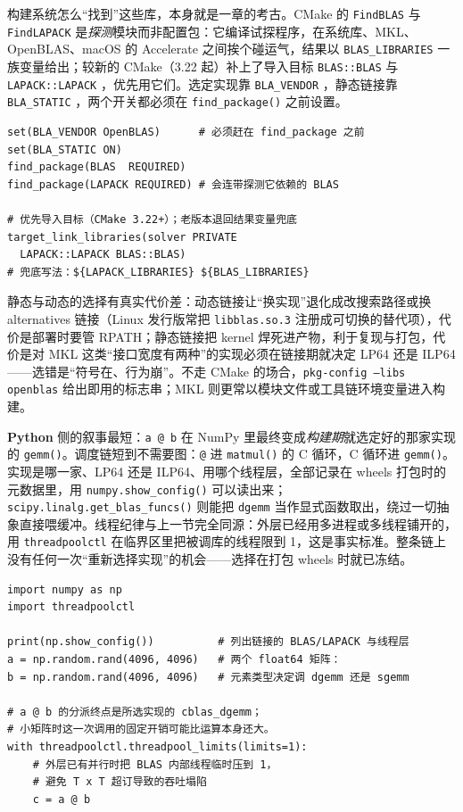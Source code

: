 \documentclass[12pt,a4paper,fontset=fandol]{ctexbook}
\newcommand{\Fn}[1]{\texttt{#1()}}
\newcommand{\Tp}[1]{\texttt{#1}}
\newcommand{\Bk}{\allowbreak}
\newcommand{\Lang}[1]{\textsf{\bfseries #1}}
\newcommand{\PY}{\Lang{Python}}
\begin{document}
构建系统怎么``找到''这些库，本身就是一章的考古。CMake 的 \Tp{FindBLAS} 与 \Tp{FindLAPACK} 是\emph{探测}模块而非配置包：它编译试探程序，在系统库、MKL、OpenBLAS、macOS 的 Accelerate 之间挨个碰运气，结果以 \Tp{BLAS\_LIBRARIES} 一族变量给出；较新的 CMake（3.22 起）补上了导入目标 \Tp{BLAS::BLAS} 与 \Tp{LAPACK::LAPACK} \Bk{}，优先用它们。选定实现靠 \Tp{BLA\_VENDOR} \Bk{}，静态链接靠 \Tp{BLA\_STATIC} \Bk{}，两个开关都必须在 \Fn{find\_package} 之前设置。

\begin{lstlisting}[style=cmakestyle,caption={CMake 里点名实现并静态链接 BLAS 与 LAPACK}]
set(BLA_VENDOR OpenBLAS)      # 必须赶在 find_package 之前
set(BLA_STATIC ON)
find_package(BLAS  REQUIRED)
find_package(LAPACK REQUIRED) # 会连带探测它依赖的 BLAS

# 优先导入目标（CMake 3.22+）；老版本退回结果变量兜底
target_link_libraries(solver PRIVATE
  LAPACK::LAPACK BLAS::BLAS)
# 兜底写法：${LAPACK_LIBRARIES} ${BLAS_LIBRARIES}
\end{lstlisting}

静态与动态的选择有真实代价差：动态链接让``换实现''退化成改搜索路径或换 alternatives 链接（Linux 发行版常把 \Tp{libblas.so.3} \Bk{} 注册成可切换的替代项），代价是部署时要管 RPATH；静态链接把 kernel 焊死进产物，利于复现与打包，代价是对 MKL 这类``接口宽度有两种''的实现必须在链接期就决定 LP64 还是 ILP64——选错是``符号在、行为崩''。不走 CMake 的场合，\Tp{pkg-config --libs openblas} 给出即用的标志串；MKL 则更常以模块文件或工具链环境变量进入构建。

\PY{} 侧的叙事最短：\Tp{a @ b} \Bk{} 在 NumPy 里最终变成\emph{构建期}就选定好的那家实现的 \Fn{gemm}。调度链短到不需要图：\Tp{@} 进 \Fn{matmul} 的 C 循环，C 循环进 \Fn{gemm}。实现是哪一家、LP64 还是 ILP64、用哪个线程层，全部记录在 wheels 打包时的元数据里，用 \Fn{numpy.show\_config} \Bk{} 可以读出来；\Fn{scipy.linalg.get\_blas\_funcs} 则能把 \Tp{dgemm} 当作显式函数取出，绕过一切抽象直接喂缓冲。线程纪律与上一节完全同源：外层已经用多进程或多线程铺开的，用 \Tp{threadpoolctl} \Bk{} 在临界区里把被调库的线程限到 1，这是事实标准。整条链上没有任何一次``重新选择实现''的机会——选择在打包 wheels 时就已冻结。

\begin{lstlisting}[style=pythonstyle,caption={\PY{}：读出门面下接的是哪家实现，并限制其线程}]
import numpy as np
import threadpoolctl

print(np.show_config())          # 列出链接的 BLAS/LAPACK 与线程层
a = np.random.rand(4096, 4096)   # 两个 float64 矩阵：
b = np.random.rand(4096, 4096)   # 元素类型决定调 dgemm 还是 sgemm

# a @ b 的分派终点是所选实现的 cblas_dgemm；
# 小矩阵时这一次调用的固定开销可能比运算本身还大。
with threadpoolctl.threadpool_limits(limits=1):
    # 外层已有并行时把 BLAS 内部线程临时压到 1，
    # 避免 T x T 超订导致的吞吐塌陷
    c = a @ b
\end{lstlisting}
\end{document}
